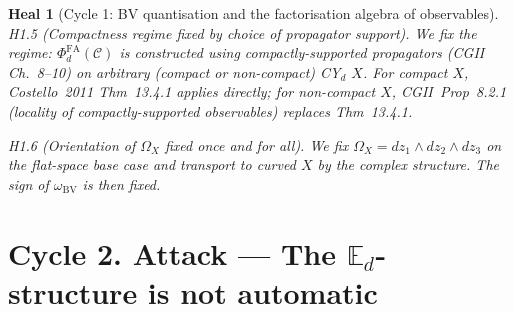 \documentclass[11pt]{article}
\newtheorem*{heal}{Heal}
\theoremstyle{definition}
\providecommand{\cC}{\mathcal{C}}
\providecommand{\BV}{\mathrm{BV}}
\providecommand{\FA}{\mathrm{FA}}
\begin{document}
\begin{heal}[Cycle 1: BV quantisation and the factorisation algebra of observables]
\emph{H1.5 (Compactness regime fixed by choice of propagator
support).} We fix the regime: $\Phi^{\FA}_d(\cC)$ is constructed using
compactly-supported propagators (CGII Ch.~8--10) on arbitrary
(compact or non-compact) CY$_d$ $X$. For compact $X$, Costello~2011
Thm~13.4.1 applies directly; for non-compact $X$, CGII~Prop~8.2.1
(locality of compactly-supported observables) replaces Thm~13.4.1.

\emph{H1.6 (Orientation of $\Omega_X$ fixed once and for all).} We
fix $\Omega_X = dz_1\wedge dz_2\wedge dz_3$ on the flat-space base
case and transport to curved $X$ by the complex structure. The sign
of $\omega_{\BV}$ is then fixed.
\end{heal}

\section*{Cycle 2. Attack --- The $\mathbb{E}_d$-structure is not automatic}
\end{document}
